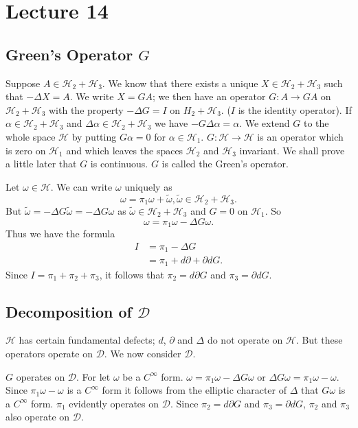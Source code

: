 \chapter{Lecture 14}

\section*{Green's Operator $G$}\pageoriginale

Suppose $A\in \mathscr{H}_{2}+\mathscr{H}_{3}$. We know that there
exists a unique $X\in\mathscr{H}_{2}+\mathscr{H}_{3}$ such that
$-\Delta X=A$. We write $X=GA$; we then have an operator $G:A\to GA$
on $\mathscr{H}_{2}+\mathscr{H}_{3}$ with the property $-\Delta G=I$
on $H_{2}+\mathscr{H}_{3}$. ($I$ is the identity operator). If
$\alpha\in \mathscr{H}_{2}+\mathscr{H}_{3}$ and
$\Delta\alpha\in\mathscr{H}_{2}+\mathscr{H}_{3}$ we have
$-G\Delta\alpha=\alpha$. We extend $G$ to the whole space
$\mathscr{H}$ by putting $G\alpha=0$ for
$\alpha\in\mathscr{H}_{1}$. $G:\mathscr{H}\to \mathscr{H}$ is an
operator which is zero on $\mathscr{H}_{1}$ and which leaves the
spaces $\mathscr{H}_{2}$ and $\mathscr{H}_{3}$ invariant. We shall
prove a little later that $G$ is continuous. $G$ is called the Green's
operator.

Let $\omega\in \mathscr{H}$. We can write $\omega$ uniquely as
$$
\omega=\pi_{1}\omega+\widetilde{\omega},
\widetilde{\omega}\in\mathscr{H}_{2}+\mathscr{H}_{3}.
$$
But $\widetilde{\mathscr{\omega}}=-\Delta G\widetilde{\omega}=-\Delta
G\omega$ as $\widetilde{\omega}\in\mathscr{H}_{2}+\mathscr{H}_{3}$ and
$G=0$ on $\mathscr{H}_{1}$. So
$$
\omega=\pi_{1}\omega-\Delta G\omega.
$$
Thus we have the formula
\begin{align*}
I &= \pi_{1}-\Delta G\\
 &= \pi_{1}+d\partial +\partial dG.
\end{align*}
Since $I=\pi_{1}+\pi_{2}+\pi_{3}$, it follows that $\pi_{2}=d\partial
G$ and $\pi_{3}=\partial dG$.

\section*{Decomposition of $\mathscr{D}$}\pageoriginale

$\mathscr{H}$ has certain fundamental defects; $d$, $\partial$ and
$\Delta$ do not operate on $\mathscr{H}$. But these operators operate
on $\mathscr{D}$. We now consider $\mathscr{D}$.

$G$ operates on $\mathscr{D}$. For let $\omega$ be a $C^{\infty}$
form. $\omega=\pi_{1}\omega-\Delta G\omega$ or $\Delta
G\omega=\pi_{1}\omega-\omega$. Since $\pi_{1}\omega-\omega$ is a
$C^{\infty}$ form it follows from the elliptic character of $\Delta$
that $G\omega$ is a $C^{\infty}$ form. $\pi_{1}$ evidently operates on
$\mathscr{D}$. Since $\pi_{2}=d\partial G$ and $\pi_{3}=\partial dG$,
$\pi_{2}$ and $\pi_{3}$ also operate on $\mathscr{D}$.

